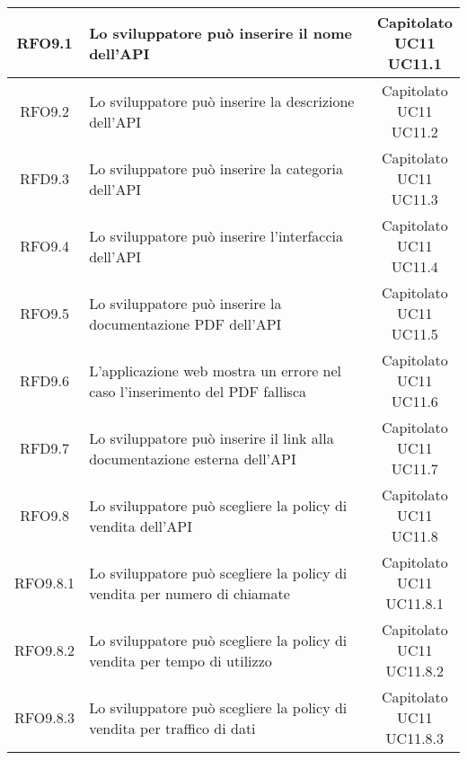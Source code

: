\begin{longtable}{|c|p{8cm}|c|}
\hypertarget{RFO9.1}{RFO9.1} & Lo sviluppatore può inserire il nome dell'API & \makecell*{Capitolato\\UC11\\UC11.1} \\
\hline
\hypertarget{RFO9,2}{RFO9.2} & Lo sviluppatore può inserire la descrizione dell'API & \makecell*{Capitolato\\UC11\\UC11.2} \\
\hline
\hypertarget{RFD9.3}{RFD9.3} & Lo sviluppatore può inserire la categoria dell'API & \makecell*{Capitolato\\UC11\\UC11.3} \\
\hline
\hypertarget{RFO9.4}{RFO9.4} & Lo sviluppatore può inserire l'interfaccia dell'API & \makecell*{Capitolato\\UC11\\UC11.4} \\
\hline
\hypertarget{RFO9.5}{RFO9.5} & Lo sviluppatore può inserire la documentazione PDF dell'API & \makecell*{Capitolato\\UC11\\UC11.5} \\
\hline
\hypertarget{RFD9.6}{RFD9.6} & L'applicazione web mostra un errore nel caso l'inserimento del PDF fallisca & \makecell*{Capitolato\\UC11\\UC11.6} \\
\hline
\hypertarget{RFD9.7}{RFD9.7} & Lo sviluppatore può inserire il link alla documentazione esterna dell'API & \makecell*{Capitolato\\UC11\\UC11.7} \\
\hline

\hypertarget{RFO9.8}{RFO9.8} & Lo sviluppatore può scegliere la policy di vendita dell'API & \makecell*{Capitolato\\UC11\\UC11.8} \\
\hline

\hypertarget{RFO9.8.1}{RFO9.8.1} & Lo sviluppatore può scegliere la policy di vendita per numero di chiamate & \makecell*{Capitolato\\UC11\\UC11.8.1} \\
\hline
\hypertarget{RFO9.8.2}{RFO9.8.2} & Lo sviluppatore può scegliere la policy di vendita per tempo di utilizzo & \makecell*{Capitolato\\UC11\\UC11.8.2} \\
\hline
\hypertarget{RFO9.8.3}{RFO9.8.3} & Lo sviluppatore può scegliere la policy di vendita per traffico di dati & \makecell*{Capitolato\\UC11\\UC11.8.3} \\
\hline


\end{longtable}
